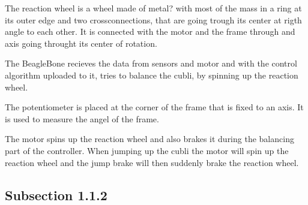 The reaction wheel is a wheel made of metal?  with most of the mass in a ring at its outer edge and two crossconnections, that are going trough its center at rigth angle to each other. It is connected with the motor and the frame through and axis going throught its center of rotation.


The BeagleBone recieves the data from sensors and motor and with the control algorithm uploaded to it, tries to balance the cubli, by spinning up the reaction wheel.

The potentiometer is placed at the corner of the frame that is fixed to an axis. It is used to measure the angel of the frame.

The motor spins up the reaction wheel and also brakes it during the balancing part of the controller. When jumping up the cubli the motor will spin up the reaction wheel and the jump brake will then suddenly brake the reaction wheel.
\subsection{Subsection 1.1.2}